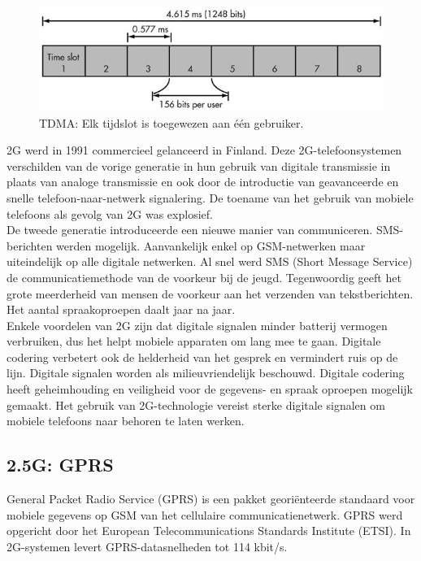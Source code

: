 \documentclass{article}
\begin{document}
\begin{figure}[H]
\centering
\includegraphics[width=0.82 \textwidth]{img/tdma.jpg}
\caption{TDMA: Elk tijdslot is toegewezen aan één gebruiker.}
\label{fig:tdma}
\end{figure}

\noindent 2G werd in 1991 commercieel gelanceerd in Finland. Deze 2G-telefoonsystemen verschilden van de vorige generatie in hun gebruik van digitale transmissie in plaats van analoge transmissie en ook door de introductie van geavanceerde en snelle telefoon-naar-netwerk signalering. De toename van het gebruik van mobiele telefoons als gevolg van 2G was explosief.\\ 

\noindent De tweede generatie introduceerde een nieuwe manier van communiceren. SMS-berichten werden mogelijk. Aanvankelijk enkel op GSM-netwerken maar uiteindelijk op alle digitale netwerken. Al snel werd SMS (Short Message Service) de communicatiemethode van de voorkeur bij de jeugd. Tegenwoordig geeft het grote meerderheid van mensen de voorkeur aan het verzenden van tekstberichten. Het aantal spraakoproepen daalt jaar na jaar.\\

\noindent Enkele voordelen van 2G zijn dat digitale signalen minder batterij vermogen verbruiken, dus het helpt mobiele apparaten om lang mee te gaan. Digitale codering verbetert ook de helderheid van het gesprek en vermindert ruis op de lijn. Digitale signalen worden als milieuvriendelijk beschouwd. Digitale codering heeft geheimhouding en veiligheid voor de gegevens- en spraak oproepen mogelijk gemaakt. Het gebruik van 2G-technologie vereist sterke digitale signalen om mobiele telefoons naar behoren te laten werken. \cite{2g}

\subsection{2.5G: GPRS}
General Packet Radio Service (GPRS) is een pakket georiënteerde standaard voor mobiele gegevens op GSM van het cellulaire communicatienetwerk. GPRS werd opgericht door het European Telecommunications Standards Institute (ETSI). In 2G-systemen levert GPRS-datasnelheden tot 114 kbit/s. \cite{2g} \\
\end{document}
